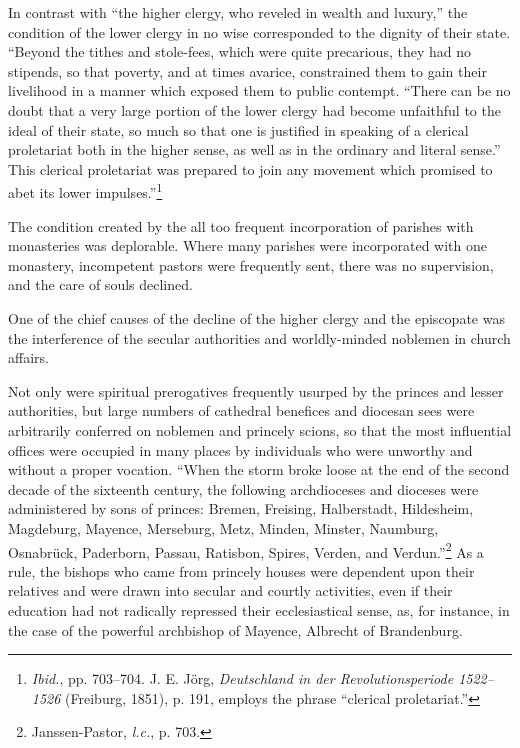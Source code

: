 In contrast with “the higher clergy, who reveled in wealth and
luxury,” the condition of the lower clergy in no wise corresponded to
the dignity of their state. “Beyond the tithes and stole-fees, which
were quite precarious, they had no stipends, so that poverty, and at
times avarice, constrained them to gain their livelihood in a manner
which exposed them to public contempt. “There can be no doubt that
a very large portion of the lower clergy had become unfaithful to
the ideal of their state, so much so that one is justified in speaking of
a clerical proletariat both in the higher sense, as well as in the ordinary
and literal sense.” This clerical proletariat was prepared to join
any movement which promised to abet its lower impulses.”\footnote
{\textit{Ibid.}, pp. 703--704. J. E. Jörg, \textit{Deutschland in der Revolutionsperiode 1522--1526} (Freiburg,
1851), p. 191, employs the phrase “clerical proletariat.”}

The condition created by the all too frequent incorporation of
parishes with monasteries was deplorable. Where many parishes were
incorporated with one monastery, incompetent pastors were frequently
sent, there was no supervision, and the care of souls declined.

One of the chief causes of the decline of the higher clergy and the
episcopate was the interference of the secular authorities and worldly-minded
noblemen in church affairs.

Not only were spiritual prerogatives frequently usurped by the
princes and lesser authorities, but large numbers of cathedral benefices
and diocesan sees were arbitrarily conferred on noblemen and princely
scions, so that the most influential offices were occupied in many
places by individuals who were unworthy and without a proper vocation.
“When the storm broke loose at the end of the second decade of
the sixteenth century, the following archdioceses and dioceses were
administered by sons of princes: Bremen, Freising, Halberstadt, Hildesheim,
Magdeburg, Mayence, Merseburg, Metz, Minden, Minster,
Naumburg, Osnabrück, Paderborn, Passau, Ratisbon, Spires, Verden,
and Verdun.”\footnote{Janssen-Pastor, \textit{l.c.}, p. 703.}
As a rule, the bishops who came from princely houses
were dependent upon their relatives and were drawn into secular and
courtly activities, even if their education had not radically repressed
their ecclesiastical sense, as, for instance, in the case of the powerful
archbishop of Mayence, Albrecht of Brandenburg.

